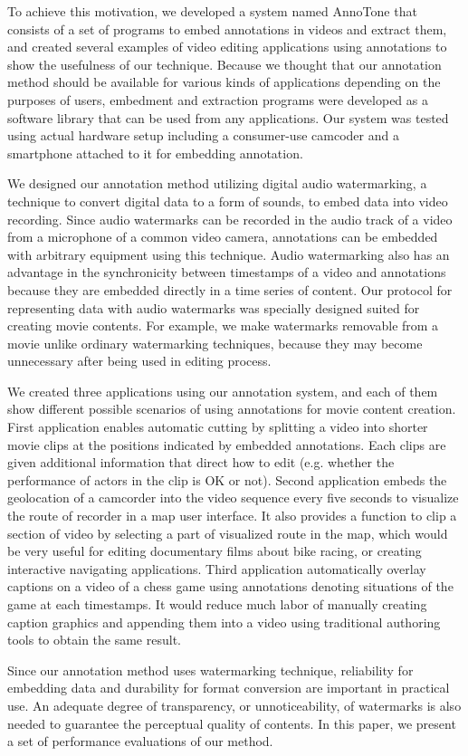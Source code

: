 To achieve this motivation, we developed a system named AnnoTone that consists of a set of programs to embed annotations in videos and extract them, and created several examples of video editing applications using annotations to show the usefulness of our technique.
Because we thought that our annotation method should be available for various kinds of applications depending on the purposes of users, embedment and extraction programs were developed as a software library that can be used from any applications.
Our system was tested using actual hardware setup including a consumer-use camcoder and a smartphone attached to it for embedding annotation.

We designed our annotation method utilizing digital audio watermarking, a technique to convert digital data to a form of sounds, to embed data into video recording.
Since audio watermarks can be recorded in the audio track of a video from a microphone of a common video camera, annotations can be embedded with arbitrary equipment using this technique.
Audio watermarking also has an advantage in the synchronicity between timestamps of a video and annotations because they are embedded directly in a time series of content.
Our protocol for representing data with audio watermarks was specially designed suited for creating movie contents.
For example, we make watermarks removable from a movie unlike ordinary watermarking techniques, because they may become unnecessary after being used in editing process.

We created three applications using our annotation system, and each of them show different possible scenarios of using annotations for movie content creation.
First application enables automatic cutting by splitting a video into shorter movie clips at the positions indicated by embedded annotations.
Each clips are given additional information that direct how to edit (e.g. whether the performance of actors in the clip is OK or not).
Second application embeds the geolocation of a camcorder into the video sequence every five seconds to visualize the route of recorder in a map user interface.
It also provides a function to clip a section of video by selecting a part of visualized route in the map, which would be very useful for editing documentary films about bike racing, or creating interactive navigating applications.
Third application automatically overlay captions on a video of a chess game using annotations denoting situations of the game at each timestamps.
It would reduce much labor of manually creating caption graphics and appending them into a video using traditional authoring tools to obtain the same result.

Since our annotation method uses watermarking technique, reliability for embedding data and durability for format conversion are important in practical use.
An adequate degree of transparency, or unnoticeability, of watermarks is also needed to guarantee the perceptual quality of contents.
In this paper, we present a set of performance evaluations of our method.
